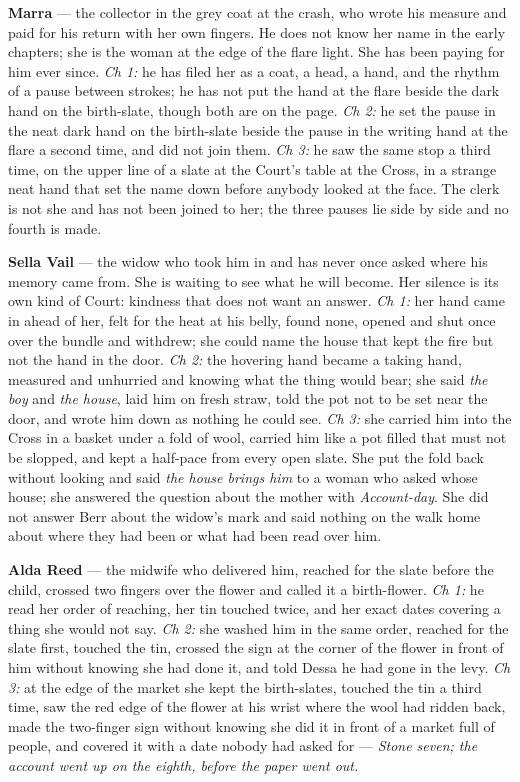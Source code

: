 \documentclass{design/chronicle}
\begin{document}
{\textbf{Marra} — the collector in the grey coat at the crash, who wrote his measure and paid for his return with her own fingers. He does not know her name in the early chapters; she is the woman at the edge of the flare light. She has been paying for him ever since. \emph{Ch 1:} he has filed her as a coat, a head, a hand, and the rhythm of a pause between strokes; he has not put the hand at the flare beside the dark hand on the birth-slate, though both are on the page. \emph{Ch 2:} he set the pause in the neat dark hand on the birth-slate beside the pause in the writing hand at the flare a second time, and did not join them. \emph{Ch 3:} he saw the same stop a third time, on the upper line of a slate at the Court’s table at the Cross, in a strange neat hand that set the name down before anybody looked at the face. The clerk is not she and has not been joined to her; the three pauses lie side by side and no fourth is made.

\textbf{Sella Vail} — the widow who took him in and has never once asked where his memory came from. She is waiting to see what he will become. Her silence is its own kind of Court: kindness that does not want an answer. \emph{Ch 1:} her hand came in ahead of her, felt for the heat at his belly, found none, opened and shut once over the bundle and withdrew; she could name the house that kept the fire but not the hand in the door. \emph{Ch 2:} the hovering hand became a taking hand, measured and unhurried and knowing what the thing would bear; she said \emph{the boy} and \emph{the house}, laid him on fresh straw, told the pot not to be set near the door, and wrote him down as nothing he could see. \emph{Ch 3:} she carried him into the Cross in a basket under a fold of wool, carried him like a pot filled that must not be slopped, and kept a half-pace from every open slate. She put the fold back without looking and said \emph{the house brings him} to a woman who asked whose house; she answered the question about the mother with \emph{Account-day}. She did not answer Berr about the widow’s mark and said nothing on the walk home about where they had been or what had been read over him.

\textbf{Alda Reed} — the midwife who delivered him, reached for the slate before the child, crossed two fingers over the flower and called it a birth-flower. \emph{Ch 1:} he read her order of reaching, her tin touched twice, and her exact dates covering a thing she would not say. \emph{Ch 2:} she washed him in the same order, reached for the slate first, touched the tin, crossed the sign at the corner of the flower in front of him without knowing she had done it, and told Dessa he had gone in the levy. \emph{Ch 3:} at the edge of the market she kept the birth-slates, touched the tin a third time, saw the red edge of the flower at his wrist where the wool had ridden back, made the two-finger sign without knowing she did it in front of a market full of people, and covered it with a date nobody had asked for --- \emph{Stone seven; the account went up on the eighth, before the paper went out.}

}
\end{document}
